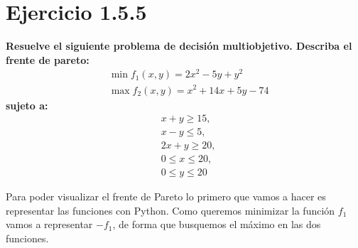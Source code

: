 \documentclass[12pt, letterpaper]{article}
\begin{document}
\newpage

\section{Ejercicio 1.5.5}
\textbf{Resuelve el siguiente problema de decisión multiobjetivo. Describa el frente de pareto:}
\begin{align*}
    & \min f_1(x,y) = 2x^{2} - 5y + y^{2} \\
    & \max f_2(x,y) = x^{2} + 14x + 5y -74
\end{align*}
\textbf{sujeto a:}
\begin{align*}
    & x + y \geq 15, \\
    & x - y \leq 5, \\
    & 2x + y \geq 20, \\
    & 0 \leq x \leq 20, \\
    & 0 \leq y \leq 20
\end{align*}

Para poder visualizar el frente de Pareto lo primero que vamos a hacer es representar las funciones con Python. Como queremos minimizar la función $f_1$ vamos a representar $-f_1$, de forma que busquemos el máximo en las dos funciones. 
\end{document}
